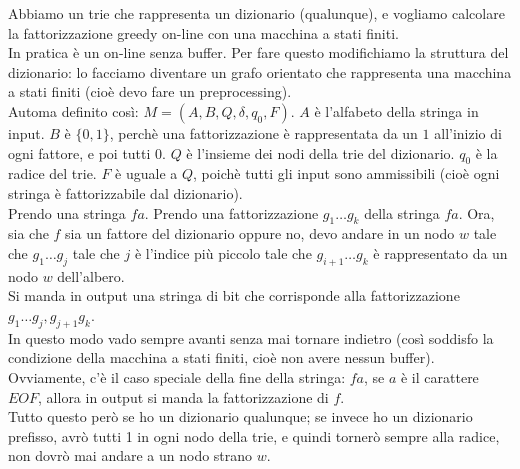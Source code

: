 \documentclass[a4paper,10pt]{article} %
\begin{document}
\bigskip
Abbiamo un trie che rappresenta un dizionario (qualunque), e vogliamo calcolare la fattorizzazione greedy on-line con una macchina a stati finiti.\\
In pratica è un on-line senza buffer. Per fare questo modifichiamo la struttura del dizionario: lo facciamo diventare un grafo orientato che rappresenta una macchina a stati finiti (cioè devo fare un preprocessing).\\
Automa definito così: $M = (A, B, Q, \delta, q_0, F)$. $A$ è l'alfabeto della stringa in input. $B$ è $\{0, 1\}$, perchè una fattorizzazione è rappresentata da un $1$ all'inizio di ogni fattore, e poi tutti $0$. $Q$ è l'insieme dei nodi della trie del dizionario. $q_0$ è la radice del trie. $F$ è uguale a $Q$, poichè tutti gli input sono ammissibili (cioè ogni stringa è fattorizzabile dal dizionario).\\
Prendo una stringa $fa$. Prendo una fattorizzazione $g_1 \ldots g_k$ della stringa $fa$. Ora, sia che $f$ sia un fattore del dizionario oppure no, devo andare in un nodo $w$ tale che $g_1 \ldots g_j$ tale che $j$ è l'indice più piccolo tale che $g_{i + 1} \ldots g_k$ è rappresentato da un nodo $w$ dell'albero.\\
Si manda in output una stringa di bit che corrisponde alla fattorizzazione $g_1 \ldots g_j, g_{j+ 1} g_k$.\\
In questo modo vado sempre avanti senza mai tornare indietro (così soddisfo la condizione della macchina a stati finiti, cioè non avere nessun buffer). Ovviamente, c'è il caso speciale della fine della stringa: $fa$, se $a$ è il carattere $EOF$, allora in output si manda la fattorizzazione di $f$.\\
Tutto questo però se ho un dizionario qualunque; se invece ho un dizionario prefisso, avrò tutti 1 in ogni nodo della trie, e quindi tornerò sempre alla radice, non dovrò mai andare a un nodo strano $w$.\\
\end{document}
